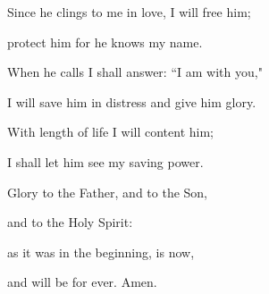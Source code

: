 \noindent Since he clings to me in love, I will free him;~\GreStar{}~\nopagebreak

protect him for he knows my name.

\noindent When he calls I shall answer: ``I am with you,"~\GreStar{}~\nopagebreak

I will save him in distress and give him glory.

\noindent With length of life I will content him;~\GreStar{}~\nopagebreak

I shall let him see my saving power.

\noindent Glory to the Father, and to the Son,~\GreStar{}~\nopagebreak

and to the Holy Spirit:

\noindent as it was in the beginning, is now,~\GreStar{}~\nopagebreak

and will be for ever. Amen.
